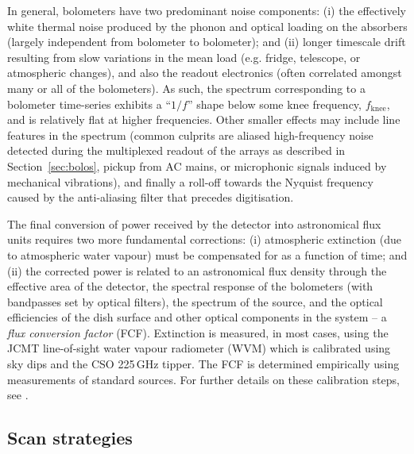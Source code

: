 \documentclass[useAMS,usenatbib,nofootinbib]{mn2e}
\begin{document}
In general, bolometers have two predominant noise components: (i) the
effectively white thermal noise produced by the phonon and optical
loading on the absorbers (largely independent from bolometer to
bolometer); and (ii) longer timescale drift resulting from slow
variations in the mean load (e.g. fridge, telescope, or atmospheric
changes), and also the readout electronics (often correlated amongst
many or all of the bolometers). As such, the spectrum corresponding to
a bolometer time-series exhibits a ``$1/f$'' shape below some knee
frequency, $f_\mathrm{knee}$, and is relatively flat at higher
frequencies. Other smaller effects may include line features in the
spectrum (common culprits are aliased high-frequency noise detected
during the multiplexed readout of the arrays as described in
Section~\ref{sec:bolos}, pickup from AC mains, or microphonic signals
induced by mechanical vibrations), and finally a roll-off towards the
Nyquist frequency caused by the anti-aliasing filter that precedes
digitisation.

The final conversion of power received by the detector into
astronomical flux units requires two more fundamental corrections: (i)
atmospheric extinction (due to atmospheric water vapour) must be
compensated for as a function of time; and (ii) the corrected power is
related to an astronomical flux density through the effective area of
the detector, the spectral response of the bolometers (with bandpasses
set by optical filters), the spectrum of the source, and the optical
efficiencies of the dish surface and other optical components in the
system -- a \emph{flux conversion factor} (FCF). Extinction is
measured, in most cases, using the JCMT line-of-sight water vapour
radiometer (WVM) which is calibrated using sky dips and the CSO
225\,GHz tipper. The FCF is determined empirically using measurements
of standard sources. For further details on these calibration steps,
see \citet{dempsey2012}.


\subsection{Scan strategies}
\label{sec:scan}
\end{document}
